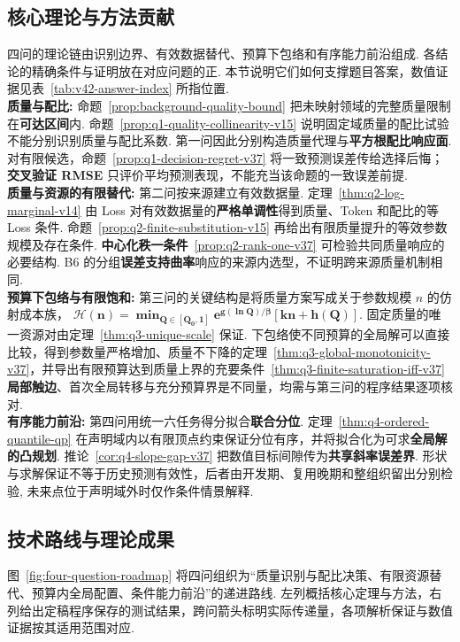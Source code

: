 \subsection{核心理论与方法贡献}
四问的理论链由识别边界、有效数据替代、预算下包络和有序能力前沿组成. 各结论的精确条件与证明放在对应问题的正. 本节说明它们如何支撑题目答案，数值证据见表~\ref{tab:v42-answer-index} 所指位置. \\
\textbf{质量与配比:}
命题~\ref{prop:background-quality-bound} 把未映射领域的完整质量限制在\textbf{可达区间}内. 命题~\ref{prop:q1-quality-collinearity-v15} 说明固定域质量的配比试验不能分别识别质量与配比系数. 第一问因此分别构造质量代理与\textbf{平方根配比响应面}. 对有限候选，命题~\ref{prop:q1-decision-regret-v37} 将一致预测误差传给选择后悔；\textbf{交叉验证 RMSE} 只评价平均预测表现，不能充当该命题的一致误差前提. \\
\textbf{质量与资源的有限替代:}
第二问按来源建立有效数据量. 定理~\ref{thm:q2-log-marginal-v14} 由 Loss 对有效数据量的\textbf{严格单调性}得到质量、Token 和配比的等 Loss 条件. 命题~\ref{prop:q2-finite-substitution-v15} 再给出有限质量提升的等效参数规模及存在条件. \textbf{中心化秩一条件}~\ref{prop:q2-rank-one-v37} 可检验共同质量响应的必要结构. B6 的分组\textbf{误差支持曲率}响应的来源内选型，不证明跨来源质量机制相同. \\
\textbf{预算下包络与有限饱和:}
第三问的关键结构是将质量方案写成关于参数规模 $n$ 的仿射成本族，
$\mathbf{\mathscr H(n)=\min_{Q\in[Q_0,1]}e^{g(\ln Q)/\beta}[kn+h(Q)]}$.
固定质量的唯一资源对由定理~\ref{thm:q3-unique-scale} 保证. 下包络使不同预算的全局解可以直接比较，得到参数量严格增加、质量不下降的定理~\ref{thm:q3-global-monotonicity-v37}，并导出有限预算达到质量上界的充要条件~\ref{thm:q3-finite-saturation-iff-v37}\textbf{ 局部触边}、首次全局转移与充分预算界是不同量，均需与第三问的程序结果逐项核对. \\
\textbf{有序能力前沿:}
第四问用统一六任务得分拟合\textbf{联合分位}. 定理~\ref{thm:q4-ordered-quantile-qp} 在声明域内以有限顶点约束保证分位有序，并将拟合化为可求\textbf{全局解的凸规划}. 推论~\ref{cor:q4-slope-gap-v37} 把数值目标间隙传为\textbf{共享斜率误差界}. 形状与求解保证不等于历史预测有效性，后者由开发期、复用晚期和整组织留出分别检验, 未来点位于声明域外时仅作条件情景解释. 

\subsection{技术路线与理论成果}\label{sec:overview-roadmap}

图~\ref{fig:four-question-roadmap} 将四问组织为“质量识别与配比决策、有限资源替代、预算内全局配置、条件能力前沿”的递进路线. 左列概括核心定理与方法，右列给出定稿程序保存的测试结果，跨问箭头标明实际传递量，各项解析保证与数值证据按其适用范围对应. 

